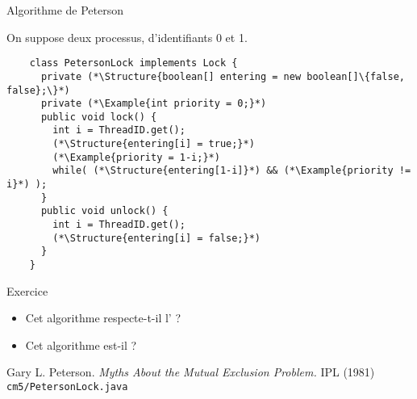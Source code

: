 
\begingroup

\begin{frame}[fragile]{Algorithme de Peterson}

  On suppose deux processus, d'identifiants 0 et 1. 

  \begin{lstlisting}
    class PetersonLock implements Lock {
      private (*\Structure{boolean[] entering = new boolean[]\{false, false};\}*)
      private (*\Example{int priority = 0;}*)
      public void lock() {
        int i = ThreadID.get();
        (*\Structure{entering[i] = true;}*)
        (*\Example{priority = 1-i;}*)
        while( (*\Structure{entering[1-i]}*) && (*\Example{priority != i}*) );
      }
      public void unlock() {
        int i = ThreadID.get();
        (*\Structure{entering[i] = false;}*)
      }
    }
  \end{lstlisting}

  \begin{exampleblock}{Exercice}
    \begin{itemize}
    \item Cet algorithme respecte-t-il l' ?
    \item Cet algorithme est-il  ?
    \end{itemize}
  \end{exampleblock}

  \begin{citing}
  \item Gary L. Peterson. \textit{Myths About the Mutual Exclusion Problem.} IPL (1981)
    \jitem \lstinline{cm5/PetersonLock.java}
  \end{citing}
\end{frame}

\endgroup
\endinput
